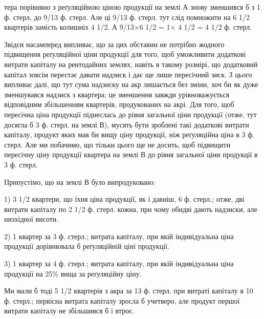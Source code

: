 тера порівняно з реґуляційною ціною продукції на землі А знову зменшився
б з 1 ф. стерл, до 9/13 ф. стерл. Але ці 9/13 ф. стерл. тут слід
помножити на 6 1/2 квартерів замість колишніх 4 1/2. А 9/13×6 1/2 = 1× 4 1/2 = 4 1/2 ф. стерл.

Звідси насамперед випливає, що за цих обставин не потрібно жодного підвищення
реґуляційної ціни продукції для того, щоб уможливити додаткові витрати
капіталу на рентодайних землях, навіть в такому розмірі, що додатковий
капітал зовсім перестає давати надзиск і дає ще лише пересічний зиск. З
цього випливає далі, що тут сума надзиску на акр лишається без зміни,
хоч би як дуже зменшувався надзиск з квартера; це зменшення завжди урівноважується
відповідним збільшенням квартерів, продукованих на акрі. Для того,
щоб пересічна ціна продукції піднеслась до рівня загальної ціни продукції (отже,
тут досягла б 3 ф. стерл. на землі В), мусять бути зроблені такі додаткові витрати
капіталу, продукт яких мав би вищу ціну продукції, ніж реґуляційна ціна
в 3 ф. стерл. Але ми побачимо, що тільки цього ще не досить, щоб підвищити
пересічну ціну продукції квартера на землі В до рівня загальної ціни продукції
в 3 ф. стерл.

Припустімо, що на землі В було випродуковано:

1) 3 1/2 квартери, що їхня ціна продукції, як і давніш, 6 ф. стерл.; отже,
дві витрати капіталу по  2 1/2 ф. стерл. кожна, при чому обидві дають надзиски,
але низхідної висоти.

2) 1 квартер за 3 ф. стерл.; витрата капіталу, при якій індивідуальна
ціна продукції дорівнювала б реґуляційній ціні продукції.

3) 1 квартер за 4 ф. стерл.; витрата капіталу, при якій індивідуальна
ціна продукції на 25\% вища за реґуляційну ціну.

Ми мали б тоді 5 1/2  квартерів з акра за 13 ф. стерл. при витраті капіталу
в 10 ф. стерл.; первісна витрата капіталу зросла б учетверо, але продукт
першої витрати капіталу не збільшився б і втроє.

